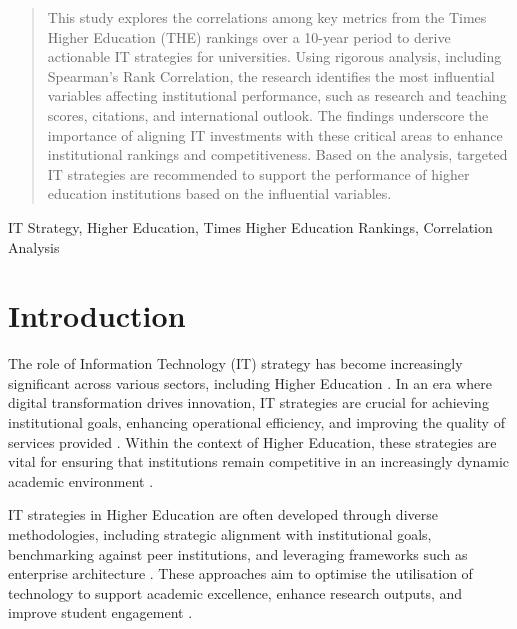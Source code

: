 \documentclass[conference]{IEEEtran}
\begin{document}
\newcommand{\al}[1]{{\textbf{\color{blue} Al: #1}}}

\maketitle

\begin{abstract}
	This study explores the correlations among key metrics from the Times Higher Education (THE) rankings over a 10-year period to derive actionable IT strategies for universities. Using rigorous analysis, including Spearman's Rank Correlation, the research identifies the most influential variables affecting institutional performance, such as research and teaching scores, citations, and international outlook. The findings underscore the importance of aligning IT investments with these critical areas to enhance institutional rankings and competitiveness. Based on the analysis, targeted IT strategies are recommended to support the performance of higher education institutions based on the influential variables.
\end{abstract}

\begin{IEEEkeywords}
	IT Strategy, Higher Education, Times Higher Education Rankings, Correlation Analysis
\end{IEEEkeywords}


\section{Introduction}


The role of Information Technology (IT) strategy has become increasingly significant across various sectors, including Higher Education \cite{hashim2021higher}. In an era where digital transformation drives innovation, IT strategies are crucial for achieving institutional goals, enhancing operational efficiency, and improving the quality of services provided \cite{rahmadi2024research}. Within the context of Higher Education, these strategies are vital for ensuring that institutions remain competitive in an increasingly dynamic academic environment \cite{fernandez2023digital}.

IT strategies in Higher Education are often developed through diverse methodologies, including strategic alignment with institutional goals, benchmarking against peer institutions, and leveraging frameworks such as enterprise architecture \cite{bianchi2023it}. These approaches aim to optimise the utilisation of technology to support academic excellence, enhance research outputs, and improve student engagement \cite{digitalsystems2022strategy}.
\end{document}
